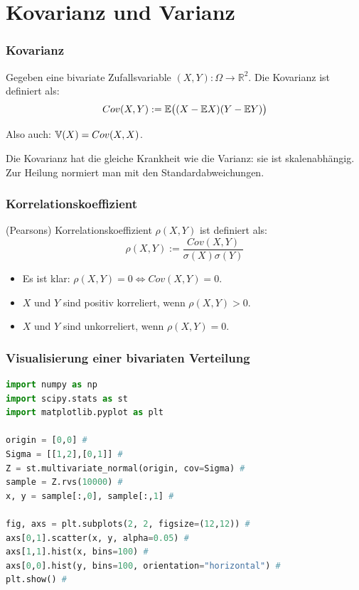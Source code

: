 \section{Kovarianz und Varianz}

\begin{frame}
  \frametitle{Kovarianz}
  \begin{definition}
    Gegeben eine bivariate Zufallsvariable $(X,Y) \colon \Omega \to \mathbb{R}^2$. Die \alert{Kovarianz} ist definiert als:
    \[ Cov(X,Y) := \mathbb{E}\big((X - \mathbb{E} X)(Y - \mathbb{E} Y)\big) \]
  \end{definition}

  \pause\vspace{0.3cm}
  Also auch: $\mathbb{V}(X) = Cov(X,X)$.

  \pause\vspace{0.5cm}
  Die Kovarianz hat die gleiche Krankheit wie die Varianz: sie ist skalenabhängig. Zur Heilung normiert man mit den Standardabweichungen.
\end{frame}

\begin{frame}
  \frametitle{Korrelationskoeffizient}
  \begin{definition}
    (Pearsons) \alert{Korrelationskoeffizient} $\rho(X,Y)$ ist definiert als:
    \[ \rho(X,Y) := \frac{Cov(X,Y)}{\sigma(X)\sigma(Y)} \]
  \end{definition}

  \pause\vspace{0.3cm}
  \begin{itemize}[<+->]
    \item Es ist klar: $\rho(X,Y) = 0 \iff Cov(X,Y) = 0$.
    \item $X$ und $Y$ sind \alert{positiv korreliert}, wenn $\rho(X,Y) > 0$.
    \item $X$ und $Y$ sind \alert{unkorreliert}, wenn $\rho(X,Y) = 0$.
  \end{itemize}
\end{frame}

\begin{frame}[fragile]
  \frametitle{Visualisierung einer bivariaten Verteilung}
  \vspace{-1cm}
\begin{lstlisting}[language=Python]
import numpy as np
import scipy.stats as st
import matplotlib.pyplot as plt

origin = [0,0] #
Sigma = [[1,2],[0,1]] #
Z = st.multivariate_normal(origin, cov=Sigma) #
sample = Z.rvs(10000) #
x, y = sample[:,0], sample[:,1] #

fig, axs = plt.subplots(2, 2, figsize=(12,12)) #
axs[0,1].scatter(x, y, alpha=0.05) #
axs[1,1].hist(x, bins=100) #
axs[0,0].hist(y, bins=100, orientation="horizontal") #
plt.show() #
\end{lstlisting}
\end{frame}

